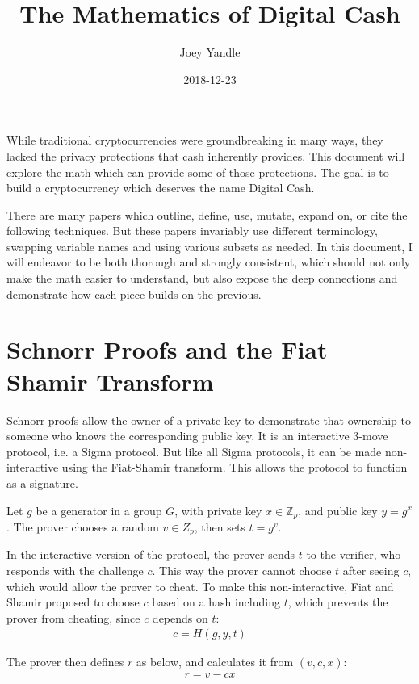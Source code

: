 \documentclass{article}
\title{The Mathematics of Digital Cash}
\date{2018-12-23}
\author{Joey Yandle}
\begin{document}
\maketitle

While traditional cryptocurrencies were groundbreaking in many ways, they lacked the privacy protections that cash inherently provides.  This document will explore the math which can provide some of those protections.  The goal is to build a cryptocurrency which deserves the name Digital Cash.

There are many papers which outline, define, use, mutate, expand on, or cite the following techniques.  But these papers invariably use different terminology, swapping variable names and using various subsets as needed.  In this document, I will endeavor to be both thorough and strongly consistent, which should not only make the math easier to understand, but also expose the deep connections and demonstrate how each piece builds on the previous.
\newpage


\section{
  Schnorr Proofs and the Fiat Shamir Transform
}

Schnorr proofs allow the owner of a private key to demonstrate that ownership to someone who knows the corresponding public key.  It is an interactive 3-move protocol, i.e. a Sigma protocol.  But like all Sigma protocols, it can be made non-interactive using the Fiat-Shamir transform.  This allows the protocol to function as a signature.

Let $g$ be a generator in a group $G$, with private key $x \in \mathbb{Z}_p$, and public key $y = g^x$. The prover chooses a random $v \in Z_p$, then sets $t = g^v$.

In the interactive version of the protocol, the prover sends $t$ to the verifier, who responds with the challenge $c$.  This way the prover cannot choose $t$ after seeing $c$, which would allow the prover to cheat.  To make this non-interactive, Fiat and Shamir proposed to choose $c$ based on a hash including $t$, which prevents the prover from cheating, since $c$ depends on $t$:
\begin{eqnarray}
  c = H(g,y,t)
\end{eqnarray}

The prover then defines $r$ as below, and calculates it from $(v, c, x)$:
\begin{eqnarray}
  r = v - cx
\end{eqnarray}
 
\end{document}
